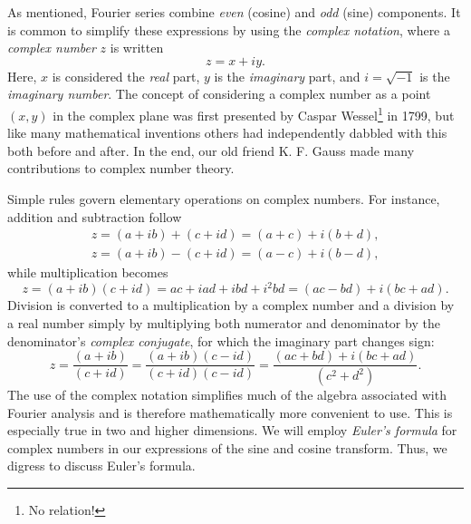 As mentioned, Fourier series combine \emph{even} (cosine) and \emph{odd} (sine) components.
It is common to simplify these expressions by using the \emph{complex notation},
where a \emph{complex number} $z$ is written
\begin{equation}
	z = x + iy.
\end{equation}
Here, $x$ is considered the \emph{real} part, $y$ is the \emph{imaginary} part,
and $i = \sqrt{-1}$ is the \emph{imaginary number}.  The concept of considering a complex number as a
point $(x, y)$ in the complex plane was first presented by Caspar Wessel\footnote{No relation!} in 1799, but like many mathematical inventions
others had independently dabbled with this both before and after.  In the end, our old friend K. F. Gauss made
many contributions to complex number theory.

Simple rules govern elementary
operations on complex numbers.  For instance, addition and subtraction follow
\begin{equation}
	\begin{array}{c}
	z = (a + ib) + (c + id) = (a + c) + i(b + d),\\
	z = (a + ib) - (c + id) = (a - c) + i(b - d),
	\end{array}
\end{equation}
while multiplication becomes
\begin{equation}
	z = (a + ib)(c + id) = ac + iad + ibd + i^2bd = (ac - bd) + i(bc + ad).
\end{equation}
Division is converted to a multiplication by a complex number and a division by a real number
simply by multiplying both numerator and denominator by the denominator's \emph{complex conjugate}, for
which the imaginary part changes sign:
\begin{equation}
	z = \frac{(a + ib)}{(c + id)} = \frac{(a + ib)(c - id)}{(c + id)(c - id)} = \frac{(ac + bd) + i(bc + ad)}{(c^2 + d^2)}.
\end{equation}
The use of the complex notation simplifies much of the algebra associated with Fourier
analysis and is therefore mathematically more convenient to use.  This is especially true
in two and higher dimensions. We will employ
\emph{Euler's formula} for complex numbers in our expressions of the sine and cosine transform.
Thus, we digress to discuss Euler's formula.

